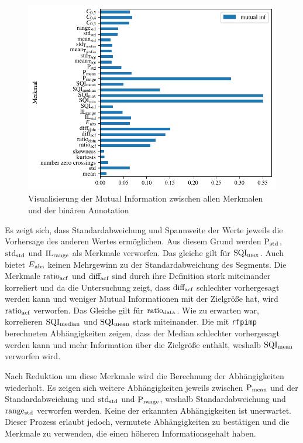 \begin{figure}[H] %
	\centering
	\includegraphics{pic/mutual-inf-own.pdf}
	\caption{Visualisierung der Mutual Information zwischen allen Merkmalen und der binären Annotation}
	\label{fig:mutual-inf-own-all}
\end{figure}

Es zeigt sich, dass Standardabweichung und Spannweite der Werte jeweils die Vorhersage des anderen Wertes ermöglichen. Aus diesem Grund werden $\text{P}\textsubscript{std}$, $\text{std}\textsubscript{std}$ und $\text{IL}\textsubscript{range}$ als Merkmale verworfen. Das gleiche gilt für $\text{SQI}\textsubscript{max}$. Auch bietet $E\textsubscript{abs}$ keinen Mehrgewinn zu der Standardabweichung des Segments. Die Merkmale $\text{ratio}\textsubscript{acf}$ und $\text{diff}\textsubscript{acf}$ sind durch ihre Definition stark miteinander korreliert und da die Untersuchung zeigt, dass $\text{diff}\textsubscript{acf}$ schlechter vorhergesagt werden kann und weniger Mutual Informationen mit der Zielgröße hat, wird $\text{ratio}\textsubscript{acf}$ verworfen. Das Gleiche gilt für $\text{ratio}\textsubscript{data}$. Wie zu erwarten war, korrelieren $\text{SQI}\textsubscript{median}$ und $\text{SQI}\textsubscript{mean}$ stark miteinander. Die mit \texttt{rfpimp} berechneten Abhängigkeiten zeigen, dass der Median schlechter vorhergesagt werden kann und mehr Information über die Zielgröße enthält, weshalb $\text{SQI}\textsubscript{mean}$ verworfen wird.

Nach Reduktion um diese Merkmale wird die Berechnung der Abhängigkeiten wiederholt. Es zeigen sich weitere Abhängigkeiten jeweils zwischen $\text{P}\textsubscript{mean}$ und der Standardabweichung und $\text{std}\textsubscript{std}$ und $\text{P}\textsubscript{range}$, weshalb Standardabweichung und $\text{range}\textsubscript{std}$ verworfen werden. Keine der erkannten Abhängigkeiten ist unerwartet. Dieser Prozess erlaubt jedoch, vermutete Abhängigkeiten zu bestätigen und die Merkmale zu verwenden, die einen höheren Informationsgehalt haben.

